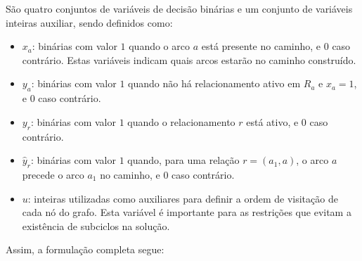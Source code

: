 São quatro conjuntos de variáveis de decisão binárias e um conjunto de variáveis inteiras auxiliar, sendo definidos como:

\begin{itemize}
    \item \textbf{$x_a$}: binárias com valor $1$ quando o arco $a$ está presente no caminho, e $0$ caso contrário. Estas variáveis indicam quais arcos estarão no caminho construído.
    \item \textbf{$y_a$}: binárias com valor $1$ quando não há relacionamento ativo em $R_a$ e $x_a=1$, e $0$ caso contrário.
    \item \textbf{$y_r$}: binárias com valor $1$ quando o relacionamento $r$ está ativo, e $0$ caso contrário.
    \item \textbf{$\hat{y}_{r}$}: binárias com valor $1$ quando, para uma relação $r = (a_1, a)$, o arco $a$ precede o arco $a_1$ no caminho, e $0$ caso contrário.
    \item \textbf{$u$}: inteiras utilizadas como auxiliares para definir a ordem de visitação de cada nó do grafo. Esta variável é importante para as restrições que evitam a existência de subciclos na solução.
\end{itemize}

Assim, a formulação completa segue:

